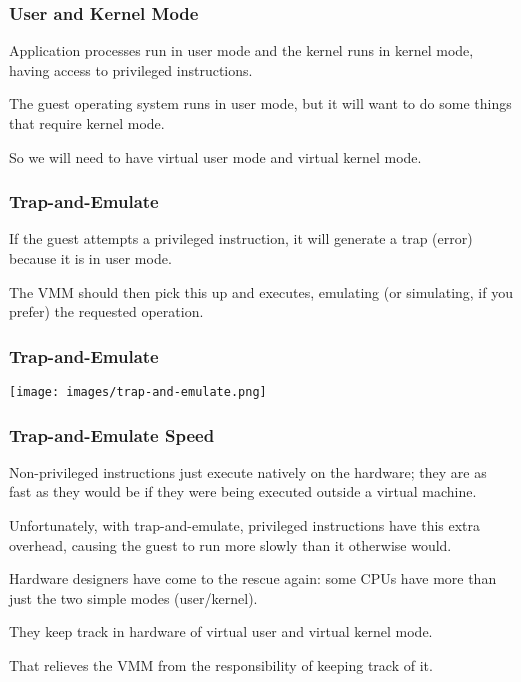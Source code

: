 \begin{frame}
\frametitle{User and Kernel Mode}

Application processes run in user mode and the kernel runs in kernel mode, having access to privileged instructions. 

The guest operating system runs in user mode, but it will want to do some things that require kernel mode.

So we will need to have virtual user mode and virtual kernel mode.

\end{frame}

\begin{frame}
\frametitle{Trap-and-Emulate}

If the guest attempts a privileged instruction, it will generate a trap (error) because it is in user mode. 

The VMM should then pick this up and executes, emulating (or simulating, if you prefer) the requested operation.

\end{frame}

\begin{frame}
\frametitle{Trap-and-Emulate}

\begin{center}
	\texttt{[image: images/trap-and-emulate.png]}
\end{center}

\end{frame}

\begin{frame}
\frametitle{Trap-and-Emulate Speed}

Non-privileged instructions just execute natively on the hardware; they are as fast as they would be if they were being executed outside a virtual machine. 

Unfortunately, with trap-and-emulate, privileged instructions have this extra overhead, causing the guest to run more slowly than it otherwise would. 

Hardware designers have come to the rescue again: some CPUs have more than just the two simple modes (user/kernel).

They keep track in hardware of virtual user and virtual kernel mode. 

That relieves the VMM from the responsibility of keeping track of it.


\end{frame}

